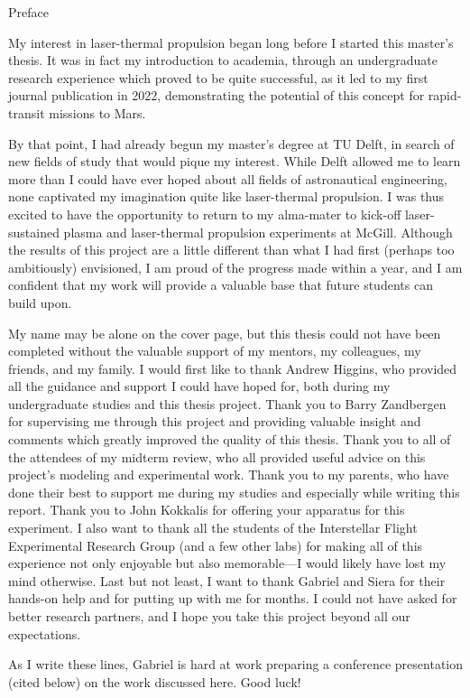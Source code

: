 \begin{plainchp}{Preface}
    \begin{refsection}
    My interest in laser-thermal propulsion began long before I started this master's thesis. It was in fact my introduction to academia, through an undergraduate research experience which proved to be quite successful, as it led to my first journal publication in 2022, demonstrating the potential of this concept for rapid-transit missions to Mars.
    
    By that point, I had already begun my master's degree at TU Delft, in search of new fields of study that would pique my interest. While Delft allowed me to learn more than I could have ever hoped about all fields of astronautical engineering, none captivated my imagination quite like laser-thermal propulsion. I was thus excited to have the opportunity to return to my alma-mater to kick-off laser-sustained plasma and laser-thermal propulsion experiments at McGill. Although the results of this project are a little different than what I had first (perhaps too ambitiously) envisioned, I am proud of the progress made within a year, and I am confident that my work will provide a valuable base that future students can build upon.

    My name may be alone on the cover page, but this thesis could not have been completed without the valuable support of my mentors, my colleagues, my friends, and my family. I would first like to thank Andrew Higgins, who provided all the guidance and support I could have hoped for, both during my undergraduate studies and this thesis project. Thank you to Barry Zandbergen for supervising me through this project and providing valuable insight and comments which greatly improved the quality of this thesis. Thank you to all of the attendees of my midterm review, who all provided useful advice on this project's modeling and experimental work. Thank you to my parents, who have done their best to support me during my studies and especially while writing this report. Thank you to John Kokkalis for offering your apparatus for this experiment. I also want to thank all the students of the Interstellar Flight Experimental Research Group (and a few other labs) for making all of this experience not only enjoyable but also memorable---I would likely have lost my mind otherwise. Last but not least, I want to thank Gabriel and Siera for their hands-on help and for putting up with me for months. I could not have asked for better research partners, and I hope you take this project beyond all our expectations.

    As I write these lines, Gabriel is hard at work preparing a conference presentation (cited below) on the work discussed here. Good luck!

    \end{refsection}
\end{plainchp}